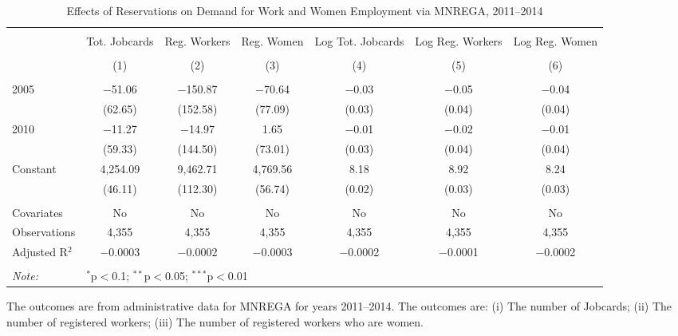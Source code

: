 \begin{sidewaystable}[!htbp]
\centering
\begin{threeparttable}

  \caption{Effects of Reservations on Demand for Work and Women Employment via MNREGA, 2011--2014} 
  \label{mnrega_main_raj_bose} 
\scriptsize 
\begin{tabular}{@{\extracolsep{0pt}}lcccccc} 
\\[-1.8ex]\hline 
\hline \\[-1.8ex] 
 & Tot. Jobcards & Reg. Workers & Reg. Women & Log Tot. Jobcards & Log Reg. Workers & Log Reg. Women \\ 
\\[-1.8ex] & (1) & (2) & (3) & (4) & (5) & (6)\\ 
\hline \\[-1.8ex] 
 2005 & $-$51.06 & $-$150.87 & $-$70.64 & $-$0.03 & $-$0.05 & $-$0.04 \\ 
  & (62.65) & (152.58) & (77.09) & (0.03) & (0.04) & (0.04) \\ 
  2010 & $-$11.27 & $-$14.97 & 1.65 & $-$0.01 & $-$0.02 & $-$0.01 \\ 
  & (59.33) & (144.50) & (73.01) & (0.03) & (0.04) & (0.04) \\ 
  Constant & 4,254.09 & 9,462.71 & 4,769.56 & 8.18 & 8.92 & 8.24 \\ 
  & (46.11) & (112.30) & (56.74) & (0.02) & (0.03) & (0.03) \\ 
 \hline \\[-1.8ex] 
Covariates & No & No & No & No & No & No \\ 
Observations & 4,355 & 4,355 & 4,355 & 4,355 & 4,355 & 4,355 \\ 
Adjusted R$^{2}$ & $-$0.0003 & $-$0.0002 & $-$0.0003 & $-$0.0002 & $-$0.0001 & $-$0.0002 \\ 
\hline 
\hline \\[-1.8ex] 
\textit{Note:}  & \multicolumn{6}{l}{$^{*}$p$<$0.1; $^{**}$p$<$0.05; $^{***}$p$<$0.01} \\ 
\end{tabular} 
\begin{tablenotes}[flushleft]
\setlength{\itemindent}{0em}
\scriptsize
\item The outcomes are from administrative data for MNREGA for years 2011--2014. 
                           The outcomes are: 
                     (i) The number of Jobcards; 
                     (ii) The number of registered workers;
                     (iii) The number of registered workers who are women.
\end{tablenotes}
\end{threeparttable}
\end{sidewaystable}
